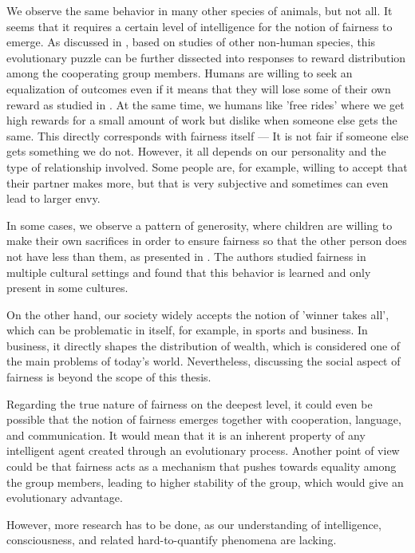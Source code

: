 We observe the same behavior in many other species of animals, but not all. It seems that it requires a certain level of intelligence for the notion of fairness to emerge. As discussed in \cite{brosnan2014evolution}, based on studies of other non-human species, this evolutionary puzzle can be further dissected into responses to reward distribution among the cooperating group members. Humans are willing to seek an equalization of outcomes even if it means that they will lose some of their own reward as studied in \cite{willing_to_pay_to_equality}. At the same time, we humans like 'free rides' where we get high rewards for a small amount of work but dislike when someone else gets the same. This directly corresponds with fairness itself --- It is not fair if someone else gets something we do not. However, it all depends on our personality and the type of relationship involved. Some people are, for example, willing to accept that their partner makes more, but that is very subjective and sometimes can even lead to larger envy.

In some cases, we observe a pattern of generosity, where children are willing to make their own sacrifices in order to ensure fairness so that the other person does not have less than them, as presented in \cite{children_generocity_blake}. The authors studied fairness in multiple cultural settings and found that this behavior is learned and only present in some cultures.

On the other hand, our society widely accepts the notion of 'winner takes all', which can be problematic in itself, for example, in sports and business. In business, it directly shapes the distribution of wealth, which is considered one of the main problems of today's world. Nevertheless, discussing the social aspect of fairness is beyond the scope of this thesis.

Regarding the true nature of fairness on the deepest level, it could even be possible that the notion of fairness emerges together with cooperation, language, and communication. It would mean that it is an inherent property of any intelligent agent created through an evolutionary process.
Another point of view could be that fairness acts as a mechanism that pushes towards equality among the group members, leading to higher stability of the group, which would give an evolutionary advantage.

However, more research has to be done, as our understanding of intelligence, consciousness, and related hard-to-quantify phenomena are lacking.

